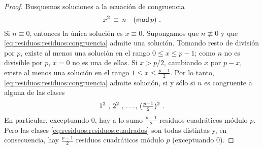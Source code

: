 \begin{proof}
	Busquemos soluciones a la ecuaci\'on de congruencia
	\begin{equation}
		\label{eq:residuos:residuos:congruencia}
		x^2\,\equiv\,n\modulo[p]
		\text{ .}
	\end{equation}
	Si $n\equiv 0$, entonces la \'unica soluci\'on es $x\equiv 0$.
	Supongamos que $n\not\equiv 0$ y que
	\eqref{eq:residuos:residuos:congruencia} admite una soluci\'on.
	Tomando resto de divisi\'on por $p$,
	existe al menos una soluci\'on en el rango $0\leq x\leq p-1$;
	como $n$ no es divisible por $p$, $x=0$ no es una de ellas.
	Si $x>p/2$, cambiando $x$ por $p-x$,
	existe al menos una soluci\'on en el rango $1\leq x\leq\frac{p-1} 2$.
	Por lo tanto, \eqref{eq:residuos:residuos:congruencia} admite
	soluci\'on, si y s\'olo si $n$ es congruente a alguna de las clases
	\begin{equation}
		\label{eq:residuos:residuos:cuadrados}
		1^2\text{ , }2^2\text{ , \dots, }(\tfrac{p-1} 2)^2
		\text{ .}
	\end{equation}
	En particular, exceptuando $0$, hay a lo sumo $\frac{p-1} 2$ residuos
	cuadr\'aticos m\'odulo $p$.
	Pero las clases \eqref{eq:residuos:residuos:cuadrados} son todas
	distintas \quedacomoejercicio%
	y, en consecuencia, hay $\frac{p-1} 2$ residuos cuadr\'aticos
	m\'odulo $p$ (exceptuando $0$).

\end{proof}
